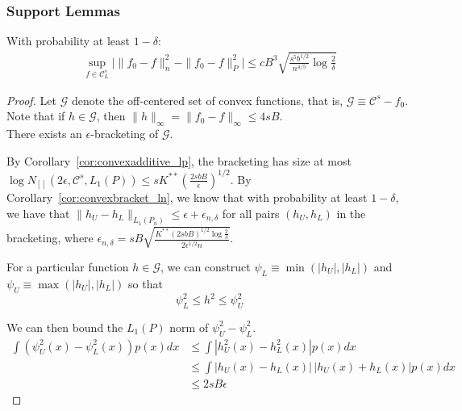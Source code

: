 \subsubsection{Support Lemmas}


\begin{lemma}
\label{lem:uniform_convergence}
With probability at least $1-\delta$:
\begin{align*}
\sup_{f \in \mathcal{C}^s_L} \Big| \| f_0 - f \|^2_n - \|f_0 - f \|^2_P\Big| \leq
   c B^3 \sqrt{ \frac{s^5b^{1/2}}{n^{4/5}} \log \frac{2}{\delta}}
\end{align*}
\end{lemma}

\begin{proof}
Let $\mathcal{G}$ denote the off-centered set of convex functions, that is, $\mathcal{G} \equiv \mathcal{C}^s - f_0$. Note that if $h \in \mathcal{G}$, then $\| h \|_\infty = \| f_0 - f \|_\infty \leq 4 s B$.\\

There exists an $\epsilon$-bracketing of $\mathcal{G}$. 


By Corollary~\ref{cor:convexadditive_lp}, the bracketing has size at most $\log N_{[]}(2\epsilon, \mathcal{C}^s, L_1(P)) \leq s K^{**}\left( \frac{2sbB}{\epsilon} \right)^{1/2}$. By Corollary~\ref{cor:convexbracket_ln}, we know that with probability at least $1-\delta$, we have that $\|h_U - h_L\|_{L_1(P_n)} \leq \epsilon + \epsilon_{n,\delta}$ for all pairs $(h_U, h_L)$ in the bracketing, where $\epsilon_{n,\delta} = sB \sqrt{ \frac{K^{**} (2sbB)^{1/2} \log \frac{2}{\delta}}{2 \epsilon^{1/2} n}}$.

For a particular function $h \in \mathcal{G}$, we can construct $\psi_L \equiv \min( |h_U|, |h_L|)$ and $\psi_U \equiv \max( |h_U|, |h_L| )$ so that
\[
\psi_L^2 \leq h^2 \leq \psi_U^2
\]

We can then bound the $L_1(P)$ norm of $\psi_U^2 - \psi_L^2$.
\begin{align*}
\int (\psi_U^2(x) - \psi_L^2(x)) p(x)dx  &\leq  \int | h_U^2(x) - h_L^2(x)| p(x) dx \\
   &\leq \int | h_U(x) - h_L(x) | \, |h_U(x) + h_L(x)| p(x) dx \\
   &\leq 2sB \epsilon
\end{align*}


\end{proof}
